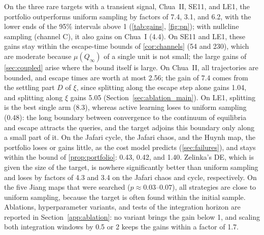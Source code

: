 On the three rare targets with a transient signal, Chua~II, SE11, and LE1, the portfolio outperforms uniform sampling by factors of 7.4, 3.1, and 6.2, with the lower ends of the 95\% intervals above 1 (\cref{tab:gains}, \cref{fig:pn}); with nullcline sampling (channel C), it also gains on Chua~I (4.4). On SE11 and LE1, these gains stay within the escape-time bounds of \cref{cor:channels} (54 and 230), which are moderate because $\mu(Q_\infty)$ of a single unit is not small; the large gains of \cref{sec:coupled} arise where the bound itself is large. On Chua~II, all trajectories are bounded, and escape times are worth at most 2.56; the gain of 7.4 comes from the settling part $D$ of $\xi$, since splitting along the escape step alone gains 1.04, and splitting along $\xi$ gains 5.05 (Section~\ref{sec:ablation_main}). On LE1, splitting is the best single arm (8.3), whereas active learning loses to uniform sampling (0.48): the long boundary between convergence to the continuum of equilibria and escape attracts the queries, and the target adjoins this boundary only along a small part of it. On the Jafari cycle, the Jafari chaos, and the Huynh map, the portfolio loses or gains little, as the cost model predicts (\cref{sec:failures}), and stays within the bound of \cref{prop:portfolio}: 0.43, 0.42, and 1.40. Zelinka's DE, which is given the size of the target, is nowhere significantly better than uniform sampling and loses by factors of 4.3 and 3.4 on the Jafari chaos and cycle, respectively. On the five Jiang maps that were searched ($p\approx0.03$--$0.07$), all strategies are close to uniform sampling, because the target is often found within the initial sample. Ablations, hyperparameter variants, and tests of the integration horizon are reported in Section~\ref{app:ablation}: no variant brings the gain below 1, and scaling both integration windows by 0.5 or 2 keeps the gains within a factor of 1.7.

